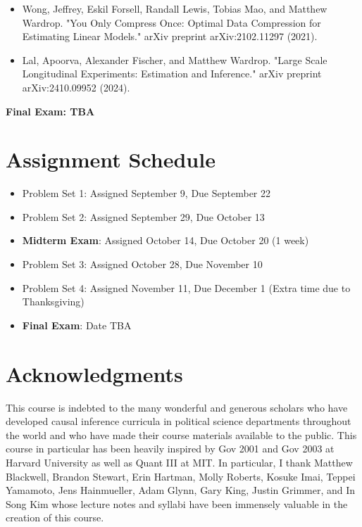 \documentclass[11pt, article, oneside]{memoir}
\theoremstyle{Assumption}
\begin{document}
\begin{itemize}
\item Wong, Jeffrey, Eskil Forsell, Randall Lewis, Tobias Mao, and Matthew Wardrop. "You Only Compress Once: Optimal Data Compression for Estimating Linear Models." arXiv preprint arXiv:2102.11297 (2021).
\item Lal, Apoorva, Alexander Fischer, and Matthew Wardrop. "Large Scale Longitudinal Experiments: Estimation and Inference." arXiv preprint arXiv:2410.09952 (2024).
\end{itemize}


\textbf{Final Exam: TBA}

\section*{Assignment Schedule}

\begin{itemize}
\item Problem Set 1: Assigned September 9, Due September 22
\item Problem Set 2: Assigned September 29, Due October 13
\item \textbf{Midterm Exam}:  Assigned October 14, Due October 20 (1 week)
\item Problem Set 3: Assigned October 28, Due November 10
\item Problem Set 4: Assigned November 11, Due December 1 (Extra time due to Thanksgiving)
\item \textbf{Final Exam}: Date TBA
\end{itemize}

\section*{Acknowledgments}

This course is indebted to the many wonderful and generous scholars who have developed causal inference curricula in political science departments throughout the world and who have made their course materials available to the public. This course in particular has been heavily inspired by Gov 2001 and Gov 2003 at Harvard University as well as Quant III at MIT. In particular, I thank Matthew Blackwell, Brandon Stewart, Erin Hartman, Molly Roberts, Kosuke Imai, Teppei Yamamoto, Jens Hainmueller, Adam Glynn, Gary King, Justin Grimmer, and In Song Kim whose lecture notes and syllabi have been immensely valuable in the creation of this course. 
\end{document}
